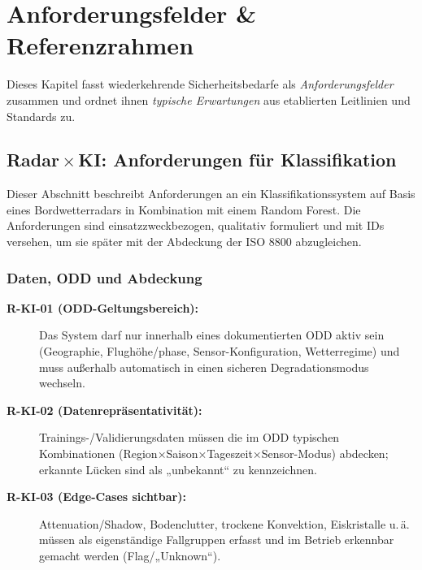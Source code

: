 \chapter{Anforderungsfelder \& Referenzrahmen}\label{chap:anforderungen}

Dieses Kapitel fasst wiederkehrende Sicherheitsbedarfe als \emph{Anforderungsfelder} zusammen und ordnet ihnen
\emph{typische Erwartungen} aus etablierten Leitlinien und Standards zu.

\section{Radar\,\texorpdfstring{$\times$}{x}\,KI: Anforderungen für Klassifikation}
\label{sec:req-radar-ki}

Dieser Abschnitt beschreibt Anforderungen an ein Klassifikationssystem auf Basis eines Bordwetterradars in Kombination 
mit einem Random Forest. Die Anforderungen sind einsatzzweckbezogen, qualitativ formuliert 
und mit IDs versehen, um sie später mit der Abdeckung der ISO 8800 abzugleichen.

\subsection{Daten, ODD und Abdeckung}
\begin{description}
  \item[\textbf{R-KI-01 (ODD-Geltungsbereich):}] Das System darf nur innerhalb eines dokumentierten ODD aktiv sein (Geographie, Flughöhe/\-phase, Sensor-Konfiguration, Wetterregime) und muss außerhalb automatisch in einen sicheren Degradationsmodus wechseln.\\
  
  \item[\textbf{R-KI-02 (Datenrepräsentativität):}] Trainings-/Validierungsdaten müssen die im ODD typischen Kombinationen (Region×Saison×Tageszeit×Sensor-Modus) abdecken; erkannte Lücken sind als „unbekannt“ zu kennzeichnen.\\

  \item[\textbf{R-KI-03 (Edge-Cases sichtbar):}] Attenuation/Shadow, Bodenclutter, trockene Konvektion, Eiskristalle u.\,ä. müssen als eigenständige Fallgruppen erfasst und im Betrieb erkennbar gemacht werden (Flag/„Unknown“).\\
\end{description}

